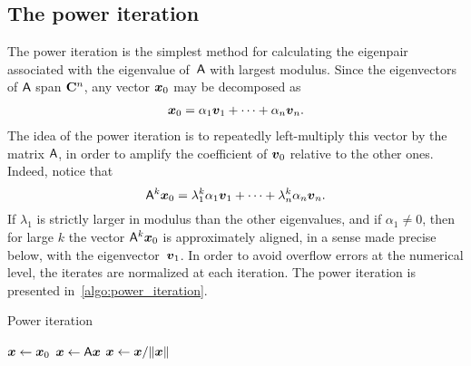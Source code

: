 \subsection{The power iteration}
The power iteration is the simplest method for calculating the eigenpair associated with the eigenvalue of~$\mathsf A$ with largest modulus.
Since the eigenvectors of $\mathsf A$ span $\mathbf C^n$,
any vector $\mathbf{\boldsymbol{x}}_0$ may be decomposed as
\begin{align}
    \label{eq:eigen_decomposition_x0}
    \mathbf{\boldsymbol{x}}_0 = \alpha_1 \mathbf{\boldsymbol{v}}_1 + \dotsb + \alpha_n \mathbf{\boldsymbol{v}}_n.
\end{align}
The idea of the power iteration is to repeatedly left-multiply this vector by the matrix $\mathsf A$,
in order to amplify the coefficient of $\mathbf{\boldsymbol{v}}_0$ relative to the other ones.
Indeed, notice that
\[
    \mathsf A^k \mathbf{\boldsymbol{x}}_0 = \lambda_1^k \alpha_1 \mathbf{\boldsymbol{v}}_1 + \dotsb + \lambda_n^k \alpha_n \mathbf{\boldsymbol{v}}_n.
\]
If $\lambda_1$ is strictly larger in modulus than the other eigenvalues,
and if $\alpha_1 \neq 0$,
then for large $k$ the vector $\mathsf A^k \mathbf{\boldsymbol{x}}_0$ is approximately aligned,
in a sense made precise below,
with the eigenvector~$\mathbf{\boldsymbol{v}}_1$.
In order to avoid overflow errors at the numerical level,
the iterates are normalized at each iteration.
The power iteration is presented in~\cref{algo:power_iteration}.
\begin{algorithm}
\caption{Power iteration}%
\label{algo:power_iteration}%
\begin{algorithmic}
\State $\mathbf{\boldsymbol{x}} \gets \mathbf{\boldsymbol{x}}_0$
    \State $\mathbf{\boldsymbol{x}} \gets \mathsf A \mathbf{\boldsymbol{x}}$
    \State $\mathbf{\boldsymbol{x}} \gets \mathbf{\boldsymbol{x}} / \lVert\mathbf{\boldsymbol{x}}\rVert$
\EndFor
\end{algorithmic}
\end{algorithm}

